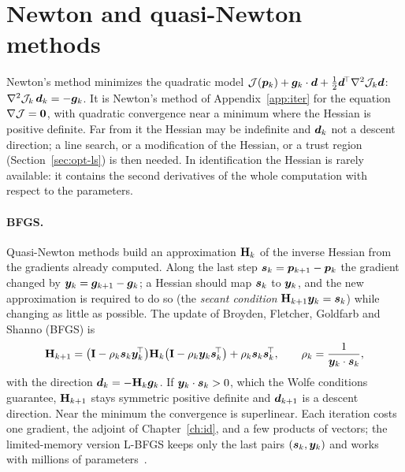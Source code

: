 \section{Newton and quasi-Newton methods}\label{sec:opt-newton}
%
Newton's method minimizes the quadratic model
$\mathcal J(\bm{p}_k)+\bm{g}_k\cdot\bm{d}+\tfrac12\bm{d}^{\!\top}\nabla^2\mathcal J_k\bm{d}$:
$\nabla^2\mathcal J_k\,\bm{d}_k=-\bm{g}_k$. It is Newton's method of
Appendix~\ref{app:iter} for the equation $\nabla\mathcal J=\bm{0}$, with quadratic
convergence near a minimum where the Hessian is positive definite. Far from it the
Hessian may be indefinite and $\bm{d}_k$ not a descent direction; a line search, or a
modification of the Hessian, or a trust region (Section~\ref{sec:opt-ls}) is then
needed. In identification the Hessian is rarely available: it contains the
second derivatives of the whole computation with respect to the parameters.

\paragraph{BFGS.}
%
Quasi-Newton methods build an approximation $\mathbf{H}_k$ of the inverse Hessian
from the gradients already computed. Along the last step
$\bm{s}_k=\bm{p}_{k+1}-\bm{p}_k$ the gradient changed by $\bm{y}_k=\bm{g}_{k+1}-\bm{g}_k$; a
Hessian should map $\bm{s}_k$ to $\bm{y}_k$, and the new approximation is required to do
so (the \emph{secant condition} $\mathbf{H}_{k+1}\bm{y}_k=\bm{s}_k$) while changing as
little as possible. The update of Broyden, Fletcher, Goldfarb and Shanno
(BFGS) is
\begin{equation}\label{eq:opt-bfgs}
  \mathbf{H}_{k+1}=\bigl(\mathbf{I}-\rho_k\bm{s}_k\bm{y}_k^{\!\top}\bigr)\mathbf{H}_k\bigl(\mathbf{I}-\rho_k\bm{y}_k\bm{s}_k^{\!\top}\bigr)
  +\rho_k\bm{s}_k\bm{s}_k^{\!\top},\qquad \rho_k=\frac1{\bm{y}_k\cdot\bm{s}_k},
\end{equation}
with the direction $\bm{d}_k=-\mathbf{H}_k\bm{g}_k$. If $\bm{y}_k\cdot\bm{s}_k>0$, which the
Wolfe conditions guarantee, $\mathbf{H}_{k+1}$ stays symmetric positive definite and
$\bm{d}_{k+1}$ is a descent direction. Near the minimum the convergence is
superlinear. Each iteration costs one gradient, the adjoint of Chapter~\ref{ch:id},
and a few products of vectors; the limited-memory version L-BFGS keeps only the
last pairs $(\bm{s}_k,\bm{y}_k)$ and works with millions of
parameters~\cite[Ch.~6--7]{NocedalWright2006b}.

